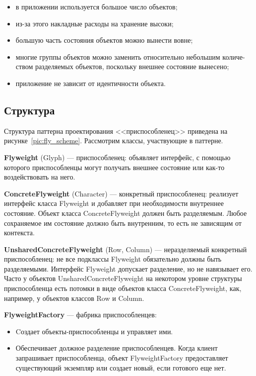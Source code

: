 \begin{itemize}
\item в приложении используется большое число объектов;

\item из-за этого накладные расходы на хранение высоки;

\item большую часть состояния объектов можно вынести вовне;

\item многие группы объектов можно заменить относительно небольшим количе-
ством разделяемых объектов, поскольку внешнее состояние вынесено;

\item приложение не зависит от идентичности объекта. 
\end{itemize}

\subsection{Структура}

Структура паттерна проектирования <<приспособленец>> приведена
на рисунке~\ref{pic:fly_scheme}. Рассмотрим классы, участвующие в паттерне.

\textbf{Flyweight} (Glyph) --- приспособленец:
объявляет интерфейс, с помощью которого приспособленцы могут получать
внешнее состояние или как-то воздействовать на него.

\textbf{ConcreteFlyweight} (Character) --- конкретный приспособленец:
реализует интерфейс класса Flyweight и добавляет при необходимости
внутреннее состояние. Объект класса ConcreteFlyweight должен быть
разделяемым. Любое сохраняемое им состояние должно быть внутренним,
то есть не зависящим от контекста.

\textbf{UnsharedConcreteFlyweight} (Row, Column) --- неразделяемый конкретный приспособленец:
не все подклассы Flyweight обязательно должны быть разделяемыми.
Интерфейс Flyweight допускает разделение, но не навязывает его.
Часто у объектов UnsharedConcreteFlyweight на некотором уровне структуры
приспособленца есть потомки в виде объектов класса ConcreteFlyweight,
как, например, у объектов классов Row и Column.

\textbf{FlyweightFactory} --- фабрика приспособленцев:
\begin{itemize}
\item Cоздает объекты-приспособленцы и управляет ими.
\item Обеспечивает должное разделение приспособленцев.
  Когда клиент запрашивает приспособленца, объект FlyweightFactory предоставляет
  существующий экземпляр или создает новый, если готового еще нет.
\end{itemize}

